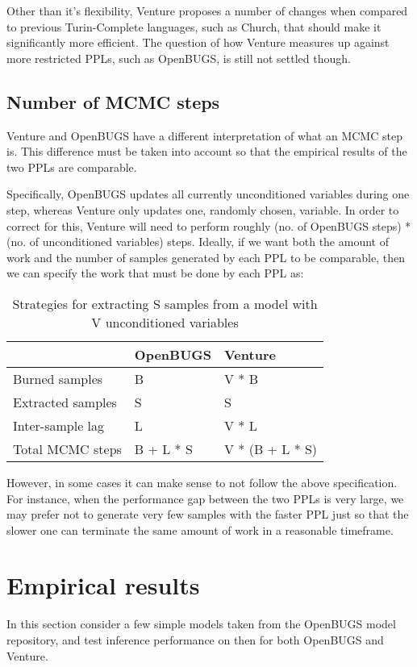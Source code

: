 Other than it's flexibility, Venture proposes a number of changes when compared to previous Turin-Complete languages, such as Church, that should make it significantly more efficient. The question of how Venture measures up against more restricted PPLs, such as OpenBUGS, is still not settled though. 

\subsection{Number of MCMC steps}
Venture and OpenBUGS have a different interpretation of what an MCMC step is. This difference must be taken into account so that the empirical results of the two PPLs are comparable.

Specifically, OpenBUGS updates all currently unconditioned variables during one step, whereas Venture only updates one, randomly chosen, variable. In order to correct for this, Venture will need to perform roughly (no. of OpenBUGS steps) * (no. of unconditioned variables) steps. Ideally, if we want both the amount of work and the number of samples generated by each PPL to be comparable, then we can specify the work that must be done by each PPL as:

\begin{table}[H]
  \centering
  \begin{tabular}{lll}
    \toprule
    & OpenBUGS & Venture \\
    \midrule
    Burned samples & B & V * B \\
    Extracted samples & S & S \\
    Inter-sample lag & L & V * L \\
    Total MCMC steps & B + L * S & V * (B + L * S) \\
    \bottomrule
  \end{tabular}
  \caption{Strategies for extracting S samples from a model with V unconditioned variables}
  \label{tab:noSteps}
\end{table}

However, in some cases it can make sense to not follow the above specification. For instance, when the performance gap between the two PPLs is very large, we may prefer not to generate very few samples with the faster PPL just so that the slower one can terminate the same amount of work in a reasonable timeframe. 

\section{Empirical results}
In this section consider a few simple models taken from the OpenBUGS model repository, and test inference performance on then for both OpenBUGS and Venture. 

